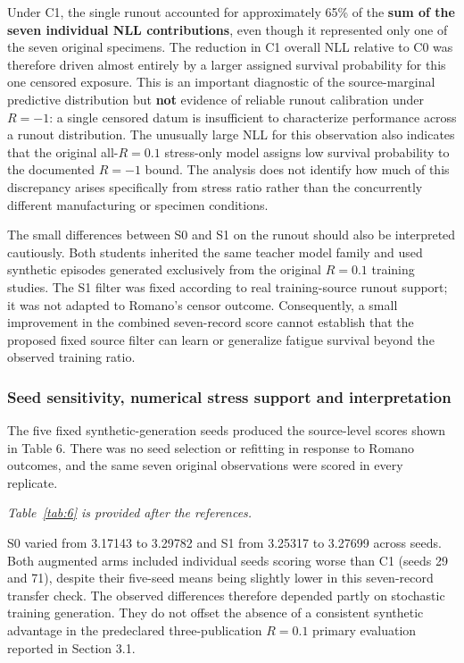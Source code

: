 \documentclass[12pt,a4paper]{article}
\begin{document}
Under C1, the single runout accounted for approximately 65\% of the \textbf{sum of the seven individual NLL contributions}, even though it represented only one of the seven original specimens. The reduction in C1 overall NLL relative to C0 was therefore driven almost entirely by a larger assigned survival probability for this one censored exposure. This is an important diagnostic of the source-marginal predictive distribution but \textbf{not} evidence of reliable runout calibration under \(R=-1\): a single censored datum is insufficient to characterize performance across a runout distribution. The unusually large NLL for this observation also indicates that the original all-\(R=0.1\) stress-only model assigns low survival probability to the documented \(R=-1\) bound. The analysis does not identify how much of this discrepancy arises specifically from stress ratio rather than the concurrently different manufacturing or specimen conditions.

The small differences between S0 and S1 on the runout should also be interpreted cautiously. Both students inherited the same teacher model family and used synthetic episodes generated exclusively from the original \(R=0.1\) training studies. The S1 filter was fixed according to real training-source runout support; it was not adapted to Romano's censor outcome. Consequently, a small improvement in the combined seven-record score cannot establish that the proposed fixed source filter can learn or generalize fatigue survival beyond the observed training ratio.

\subsubsection{Seed sensitivity, numerical stress support and interpretation}

The five fixed synthetic-generation seeds produced the source-level scores shown in Table 6. There was no seed selection or refitting in response to Romano outcomes, and the same seven original observations were scored in every replicate.

\noindent\textit{Table~\ref{tab:6} is provided after the references.}\par

S0 varied from 3.17143 to 3.29782 and S1 from 3.25317 to 3.27699 across seeds. Both augmented arms included individual seeds scoring worse than C1 (seeds 29 and 71), despite their five-seed means being slightly lower in this seven-record transfer check. The observed differences therefore depended partly on stochastic training generation. They do not offset the absence of a consistent synthetic advantage in the predeclared three-publication \(R=0.1\) primary evaluation reported in Section 3.1.
\end{document}
